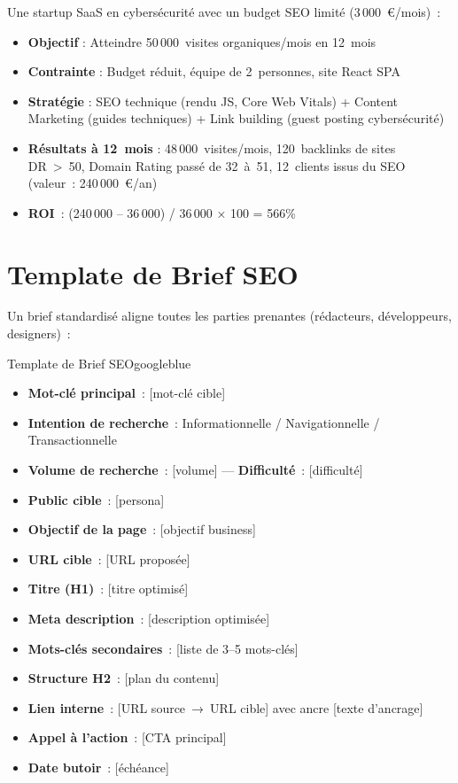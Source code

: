 \documentclass[12pt,a4paper,twoside]{report}
\begin{document}
Une startup SaaS en cybersécurité avec un budget SEO limité (3\,000~€/mois)~:
\begin{itemize}
    \item \textbf{Objectif} : Atteindre 50\,000~visites organiques/mois en 12~mois
    \item \textbf{Contrainte} : Budget réduit, équipe de 2~personnes, site React SPA
    \item \textbf{Stratégie} : SEO technique (rendu JS, Core Web Vitals) + Content Marketing (guides techniques) + Link building (guest posting cybersécurité)
    \item \textbf{Résultats à 12~mois} : 48\,000~visites/mois, 120~backlinks de sites DR~>~50, Domain Rating passé de 32~à~51, 12~clients issus du SEO (valeur~: 240\,000~€/an)
    \item \textbf{ROI}~: (240\,000 -- 36\,000) / 36\,000 × 100 = 566\%
\end{itemize}

\section{Template de Brief SEO}

Un brief standardisé aligne toutes les parties prenantes (rédacteurs, développeurs, designers)~:

\begin{mybox}{Template de Brief SEO}{googleblue}
\begin{itemize}
    \item \textbf{Mot-clé principal}~: [mot-clé cible]
    \item \textbf{Intention de recherche}~: Informationnelle / Navigationnelle / Transactionnelle
    \item \textbf{Volume de recherche}~: [volume] --- \textbf{Difficulté}~: [difficulté]
    \item \textbf{Public cible}~: [persona]
    \item \textbf{Objectif de la page}~: [objectif business]
    \item \textbf{URL cible}~: [URL proposée]
    \item \textbf{Titre (H1)}~: [titre optimisé]
    \item \textbf{Meta description}~: [description optimisée]
    \item \textbf{Mots-clés secondaires}~: [liste de 3--5 mots-clés]
    \item \textbf{Structure H2}~: [plan du contenu]
    \item \textbf{Lien interne}~: [URL source~→~URL cible] avec ancre [texte d'ancrage]
    \item \textbf{Appel à l'action}~: [CTA principal]
    \item \textbf{Date butoir}~: [échéance]
\end{itemize}
\end{mybox}
\end{document}
